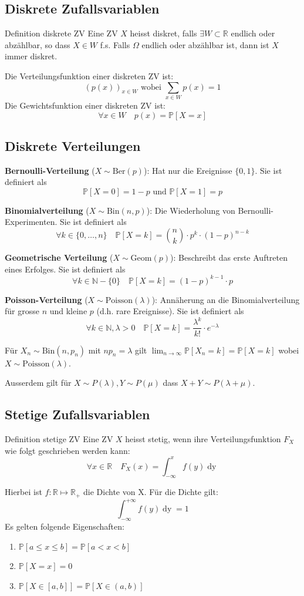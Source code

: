 \documentclass[a4paper,10pt]{article}
\def\R{\mathbb{R}}
\def\P{\mathbb{P}}
\begin{document}
\subsection{Diskrete Zufallsvariablen}
\begin{subbox}{Definition diskrete ZV}
	Eine ZV \(X\) heisst diskret, falls \(\exists W \subset \R\) endlich oder abzählbar, so dass \(X \in W\) f.s. Falls \(\Omega\) endlich oder abzählbar ist, dann ist \(X\) immer diskret.
\end{subbox}
\noindent Die Verteilungsfunktion einer diskreten ZV ist:
\[(p(x))_{x \in W} \text{ wobei } \sum_{x\in W} p(x) = 1\]
Die Gewichtsfunktion einer diskreten ZV ist:
\[\forall x \in W \quad p(x) = \P[X=x]\]

\subsection{Diskrete Verteilungen}
\textbf{Bernoulli-Verteilung} (\(X \sim \text{Ber}(p)\)): Hat nur die Ereignisse \(\{0,1\}\). Sie ist definiert als
\[\P[X=0] = 1-p \text{ und } \P[X=1]=p\]

\noindent \textbf{Binomialverteilung} (\(X \sim \text{Bin}(n,p)\)): Die Wiederholung von Bernoulli-Experimenten. Sie ist definiert als
\[\forall k \in \{0, \ldots, n\} \quad \P[X=k] = \binom{n}{k} \cdot p^k \cdot (1-p)^{n-k}\]

\noindent \textbf{Geometrische Verteilung} (\(X \sim \text{Geom}(p)\)): Beschreibt das erste Auftreten eines Erfolges. Sie ist definiert als
\[\forall k \in \mathbb{N} - \{0\} \quad \P[X=k]=(1-p)^{k-1}\cdot p\]

\noindent \textbf{Poisson-Verteilung} (\(X \sim \text{Poisson}(\lambda)\)): Annäherung an die Binomialverteilung für grosse \(n\) und kleine \(p\) (d.h. rare Ereignisse). Sie ist definiert als
\[\forall k \in \mathbb{N}, \lambda > 0 \quad \P[X=k]=\frac{\lambda^k}{k!}\cdot e^{-\lambda}\]

Für $X_n \sim \text{Bin}(n, p_n)$ mit $n p_n = \lambda$ gilt $\lim_{n \to \infty} \P[X_n = k] = \P[X = k]$ wobei $X \sim \text{Poisson}(\lambda)$.

Ausserdem gilt für $X \sim P(\lambda), Y \sim P(\mu)$ dass $X + Y \sim P(\lambda + \mu)$.


\subsection{Stetige Zufallsvariablen}
\begin{subbox}{Definition stetige ZV}
	Eine ZV \(X\) heisst stetig, wenn ihre Verteilungsfunktion \(F_X\) wie folgt geschrieben werden kann:
	\[\forall x \in \R \quad F_X(x) = \int_{-\infty}^x f(y) \mathop{dy}\]
\end{subbox}
Hierbei ist \(f: \R \mapsto \R_+\) die Dichte von X. Für die Dichte gilt:
\[\int_{-\infty}^{+\infty}f(y) \mathop{dy} = 1\]
Es gelten folgende Eigenschaften:
\begin{enumerate}
	\item \(\P[a \le x \le b] = \P[a < x < b]\)
	\item \(\P[X=x] = 0\)
	\item \(\P[X \in [a,b]] = \P[X \in (a,b)]\)
\end{enumerate}
\end{document}
